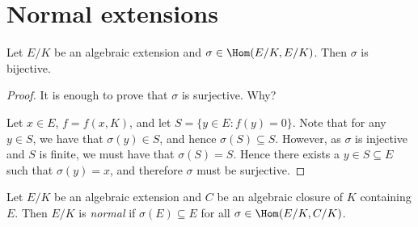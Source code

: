 

\section{Normal extensions}

\begin{proposition}
    Let $E/K$ be an algebraic extension and $\sigma\in\Hom(E/K,E/K)$. 
    Then $\sigma$ is bijective. 
\end{proposition}

\begin{proof}
    It is enough to prove that $\sigma$ is surjective. Why? 
    
    Let $x\in E$, $f=f(x,K)$, and let $S=\{y \in E : f(y)=0\}$. Note that for any $y \in S$, we have that $\sigma(y) \in S$, and hence $\sigma(S) \subseteq S$. However, as $\sigma$ is injective and $S$ is finite, we must have that $\sigma(S)=S$. Hence there exists a $y \in S \subseteq E$ such that $\sigma(y)=x$, and therefore $\sigma$ must be surjective.
    
\end{proof}



\begin{definition}
    Let $E/K$ be an algebraic extension and $C$ be an algebraic closure of $K$ containing $E$. Then $E/K$ is \emph{normal} if 
    $\sigma(E)\subseteq E$ for all $\sigma\in\Hom(E/K,C/K)$. 
\end{definition}

